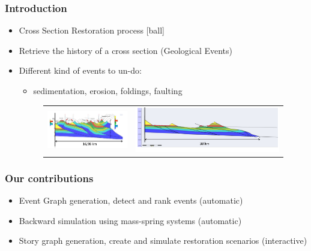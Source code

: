 \documentclass{beamer}
\begin{document}
	\begin{frame}
	\frametitle{Introduction}
	\begin{itemize}
	[ball]
	\item Cross Section Restoration process
	[ball]
	\item Retrieve the history of a cross section (Geological Events)
	\item Different kind of events to un-do:\\ 
	\begin{itemize}
		\item sedimentation, erosion, foldings, faulting
	\end{itemize}
	\begin{figure}[H]
	\centering
	\hspace*{-0.3cm}
	\begin{tabular}{@{}cc@{}}
	\includegraphics[width=.49\textwidth]{Wraped_Section.png}&
	\includegraphics[width=.48\textwidth]{UnWraped_Section.png}\\
	\end{tabular}
	\end{figure}
	\end{itemize}
	\end{frame}

	\begin{frame}
	\frametitle{Our contributions}
	\begin{itemize}
	\item Event Graph generation, detect and rank events (automatic)
	\item Backward simulation using mass-spring systems (automatic)
	\item Story graph generation, create and simulate restoration scenarios (interactive)
	\end{itemize}
    \end{frame}	
	
\end{document}
